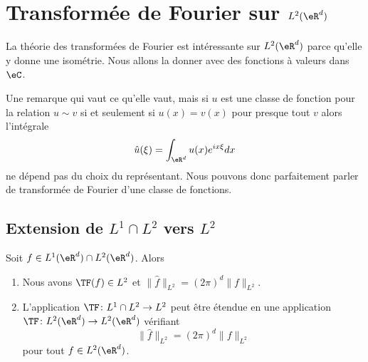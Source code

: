 \section{Transformée de Fourier sur \( L^2(\eR^d)\)}

La théorie des transformées de Fourier est intéressante sur \( L^2(\eR^d)\) parce qu'elle y donne une isométrie. Nous allons la donner avec des fonctions à valeurs dans \( \eC\).

\begin{remark}
    Une remarque qui vaut ce qu'elle vaut, mais si \( u\) est une classe de fonction pour la relation \( u\sim v\) si et seulement si \( u (x)=v(x)\) pour presque tout \( v\) alors l'intégrale
    \begin{equation}
        \hat u(\xi)=\int_{\eR^d}u(x) e^{ix\xi}dx
    \end{equation}
    ne dépend pas du choix du représentant. Nous pouvons donc parfaitement parler de transformée de Fourier d'une classe de fonctions.
\end{remark}

\subsection{Extension de \( L^1\cap L^2\) vers \( L^2\)}

\begin{theorem}       \label{THOooJLCDooAjTvJf}
    Soit \( f\in L^1(\eR^d)\cap L^2(\eR^d)\). Alors
    \begin{enumerate}
        \item
            Nous avons \( \TF(f)\in L^2\) et \( \| \hat f\|_{L^2}= (2\pi)^d  \| f \|_{L^2}\).
        \item
            L'application \( \TF\colon L^1\cap L^2\to L^2\) peut être étendue en une application \( \TF\colon L^2(\eR^d)\to L^2(\eR^d)\) vérifiant
            \begin{equation}
                \| \hat f \|_{L^2}=(2\pi)^d\| f \|_{L^2}
            \end{equation}
            pour tout \( f\in L^2(\eR^d)\).
    \end{enumerate}
\end{theorem}

